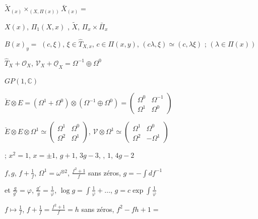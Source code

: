 \documentclass[11pt,a4paper]{article}
\begin{document}
$\widetilde{X}_{(x)} \times_{(X, \Pi(x))} \bar{X}_{(x)} =$ \ill{}

$X(x)$, $\Pi_1(X, x)$ , $\widetilde{X}$, $\Pi_x \times \bar{\Pi}_x$ \ill{}

$B(x)_y =$  $(c, \xi)$, $\xi \in \hat{T}_{X,x}$, $c \in \Pi(x,y)$, $(c\lambda, \xi) \simeq (c, \lambda\xi)$ ; $(\lambda \in \Pi(x))$

$\hat{T}_X + \mathcal{O}_X$, $\mathcal{V}_X + \underline{\mathcal{O}}_X = \Omega^{-1} \oplus \Omega^0$

$GP(1, \mathbb{C})$

$\check{E} \otimes E = (\Omega^1 + \Omega^0) \otimes (\Omega^{-1} \oplus \Omega^0) = \begin{pmatrix} \Omega^0 & \Omega^{-1} \\ \Omega^1 & \Omega^0 \end{pmatrix}$

$\check{E} \otimes E \otimes \Omega^1 \simeq \begin{pmatrix} \Omega^1 & \Omega^0 \\ \Omega^2 & \Omega^1 \end{pmatrix}$, $\mathcal{V} \otimes \Omega^1 \simeq \begin{pmatrix} \Omega^1 & \Omega^0 \\ \Omega^2 & -\Omega^1 \end{pmatrix}$

\struck{\ill{}} ; $x^2 = 1$, $x = \pm 1$, $g+1$, $3g-3$, , $1$, $4g-2$

$f, g$, $f + \frac{1}{f}$, $\Omega^1 = \omega^{\otimes 2}$, $\frac{f^2+1}{f}$ sans zéros, $g = -\int df^{-1}$

et $\frac{g}{g'} = \varphi$, $\frac{g'}{g} = \frac{1}{\varphi}$, $\log g = \int \frac{1}{\varphi} + \dots$, $g = c \exp \int \frac{1}{\varphi}$

$f \longmapsto \frac{1}{f}$, $f + \frac{1}{f} = \frac{f^2+1}{f} = h$ sans zéros, $f^2 - fh + 1 =$
\end{document}
